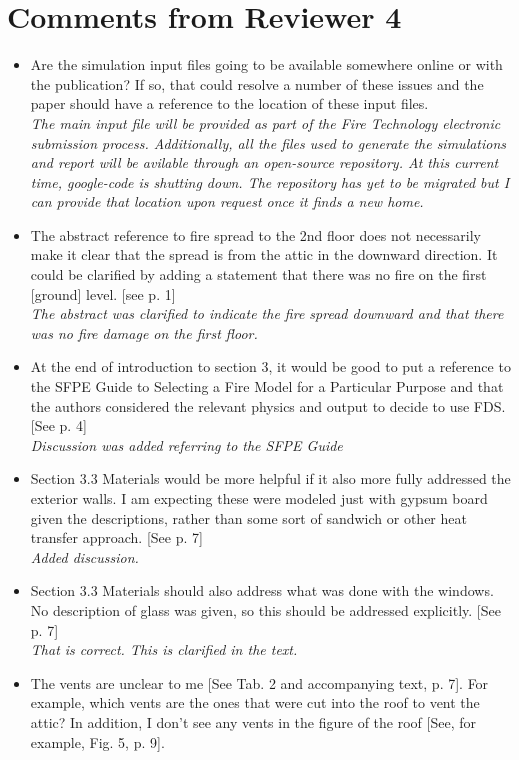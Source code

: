 \documentclass[12pt]{article}
\begin{document}
\section{Comments from Reviewer 4}
\begin{itemize}
\item Are the simulation input files going to be available somewhere online or with the publication? If so, that could resolve a number of these issues and the paper should have a reference to the location of these input files. \\
{\it The main input file will be provided as part of the Fire Technology electronic submission process. Additionally, all the files used to generate the simulations and report will be avilable through an open-source repository. At this current time, google-code is shutting down. The repository has yet to be migrated but I can provide that location upon request once it finds a new home.}
\item  The abstract reference to fire spread to the 2nd floor does not necessarily make it clear that the spread is from the attic in the downward direction. It could be clarified by adding a statement that there was no fire on the first [ground] level. [see p. 1] \\
{\it The abstract was clarified to indicate the fire spread downward and that there was no fire damage on the first floor.}
\item At the end of introduction to section 3, it would be good to put a reference to the SFPE Guide to Selecting a Fire Model for a Particular Purpose and that the authors considered the relevant physics and output to decide to use FDS. [See p. 4] \\
{\it Discussion was added referring to the SFPE Guide}
\item  Section 3.3 Materials would be more helpful if it also more fully addressed the exterior walls. I am expecting these were modeled just with gypsum board given the descriptions, rather than some sort of sandwich or other heat transfer approach. [See p. 7] \\
{\it Added discussion.}
\item Section 3.3 Materials should also address what was done with the windows. No description of glass was given, so this should be addressed explicitly. [See p. 7] \\
{\it That is correct. This is clarified in the text.}
\item The vents are unclear to me [See Tab. 2 and accompanying text, p. 7]. For example, which vents are the ones that were cut into the roof to vent the attic? In addition, I don't see any vents in the figure of the roof [See, for example, Fig. 5, p. 9]. \\

\end{itemize}
\end{document}
